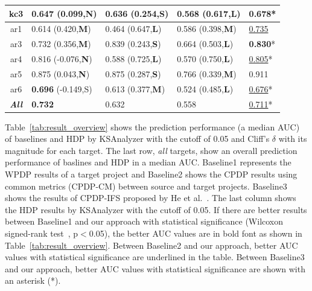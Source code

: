 \begin{table}[!t]
\begin{tabular}{|@{}c@{}||@{}C{21mm}@{}|@{}C{21mm}@{}|@{}C{21mm}@{}||@{}C{8mm}@{}|}
kc3 &0.647 (0.099,{\bf N})  &0.636 (0.254,{\bf S})  &0.568 (0.617,{\bf L})  &0.678* \\ \hline
ar1 &0.614 (0.420,{\bf M})  &0.464 (0.647,{\bf L})  &0.586 (0.398,{\bf M})  &\underline{0.735} \\ \hline
ar3 &0.732 (0.356,{\bf M})  &0.839 (0.243,{\bf S})  &0.664 (0.503,{\bf L})  &{\bf 0.830}* \\ \hline
ar4 &0.816 (-0.076,{\bf N}) &0.588 (0.725,{\bf L})  &0.570 (0.750,{\bf L})  &\underline{0.805}* \\ \hline
ar5 &0.875 (0.043,{\bf N})  &0.875 (0.287,{\bf S})  &0.766 (0.339,{\bf M})  &0.911 \\ \hline
ar6 &{\bf 0.696} (-0.149,S) &0.613 (0.377,{\bf M})  &0.524 (0.485,{\bf L})  &\underline{0.676}* \\ \hline
\hline
{\bf {\em All}}     &{\bf 0.732}            &0.632          &0.558          &\underline{0.711}*
\\ \hline



\end{tabular}
\end{table}

%


Table~\ref{tab:result_overview} shows the prediction performance (a median AUC)
of baselines and HDP by KSAnalyzer with the cutoff of 0.05 and Cliff's $\delta$ with its magnitude
for each target. The last row, {\em all} targets, show an overall prediction performance of baslines and HDP in a median AUC. Baseline1 represents
the WPDP results of a target project and Baseline2 shows
the CPDP results using common metrics (CPDP-CM) between source and target
projects. Baseline3 shows the results of CPDP-IFS proposed by He et
al.~\cite{He14}. The last column shows the HDP results by KSAnalyzer with the
cutoff of 0.05. If there are better results between Baseline1 and our approach with statistical significance (Wilcoxon signed-rank
test~\cite{Wilcoxon45}, p$<$0.05), the better AUC values are in
bold font as shown in Table~\ref{tab:result_overview}.
Between Baseline2 and our approach, better AUC values with
statistical significance are underlined in
the table. Between Baseline3 and our approach, better AUC values with
statistical significance are shown with an asterisk (*).

